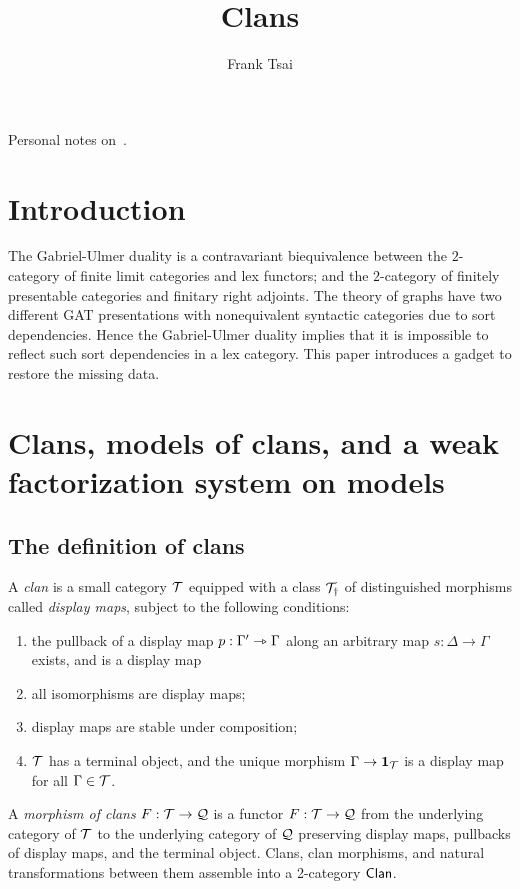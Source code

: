 \documentclass[a4paper]{article}
\title{Clans}
\author{Frank Tsai}
\begin{document}
\maketitle

Personal notes on~\cite{Frey25}.

\section{Introduction}
The Gabriel-Ulmer duality is a contravariant biequivalence between the $2$-category of finite limit categories and lex functors; and the $2$-category of finitely presentable categories and finitary right adjoints.
The theory of graphs have two different GAT presentations with nonequivalent syntactic categories due to sort dependencies.
Hence the Gabriel-Ulmer duality implies that it is impossible to reflect such sort dependencies in a lex category.
This paper introduces a gadget to restore the missing data.

\section{Clans, models of clans, and a weak factorization system on models}

\subsection{The definition of clans}
\begin{definition}
  A \emph{clan} is a small category $\mathcal{T}$ equipped with a class $\mathcal{T}_{\dag}$ of distinguished morphisms called \emph{display maps}, subject to the following conditions:
  \begin{enumerate}
  \item the pullback of a display map $p : \Gamma' \rightarrowtriangle \Gamma$ along an arbitrary map $s : \Delta \to \Gamma$ exists, and is a display map
    \begin{center}
    \end{center}
  \item all isomorphisms are display maps;
  \item display maps are stable under composition;
  \item $\mathcal{T}$ has a terminal object, and the unique morphism $\Gamma \to \mathbf{1}_{\mathcal{T}}$ is a display map for all $\Gamma \in \mathcal{T}$.
  \end{enumerate}
  A \emph{morphism of clans} $F : \mathcal{T} \to \mathcal{Q}$ is a functor $F : \mathcal{T} \to \mathcal{Q}$ from the underlying category of $\mathcal{T}$ to the underlying category of $\mathcal{Q}$ preserving display maps, pullbacks of display maps, and the terminal object.
  Clans, clan morphisms, and natural transformations between them assemble into a 2-category $\mathsf{Clan}$.
\end{definition}
\end{document}
